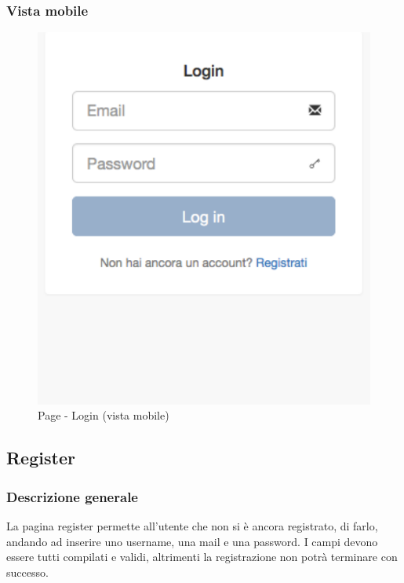 		\subsubsection{Vista mobile} %
		\begin{figure}[!h]
			\centering
			\centerline{\includegraphics[scale=0.5]{./images/mockup/login_vm.pdf}}
			\caption{Page - Login (vista mobile)}
		\end{figure}

\clearpage

	\subsection{Register} %
	\label{sub:register}
		\subsubsection{Descrizione generale} %
		La pagina register permette all'utente che non si è ancora registrato, di farlo, andando ad inserire uno username, una mail e una password. I campi devono essere tutti compilati e validi, altrimenti la registrazione non potrà terminare con successo.

